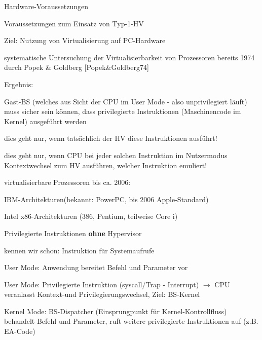 \documentclass[a4paper]{article}
\newcommand{\cmark}{\ding{51}}
\newcommand{\xmark}{\ding{55}}
\begin{document}
\begin{multicols}{3}
    Hardware-Voraussetzungen

    \begin{itemize*}
        \item
        Voraussetzungen zum Einsatz von Typ-1-HV
        \begin{itemize*}
            \item Ziel: Nutzung von Virtualisierung auf PC-Hardware
            \item systematische Untersuchung der Virtualisierbarkeit von Prozessoren bereits 1974 durch Popek \& Goldberg {[}Popek\&Goldberg74{]}
            \item Ergebnis: \begin{itemize*} \item   Gast-BS (welches aus Sicht der CPU im User Mode - also   unprivilegiert läuft) muss sicher sein können, dass privilegierte   Instruktionen (Maschinencode im Kernel) ausgeführt werden \item   dies geht nur, wenn tatsächlich der HV diese Instruktionen   ausführt! \item   dies geht nur, wenn CPU bei jeder solchen Instruktion im   Nutzermodus Kontextwechsel zum HV ausführen, welcher Instruktion   emuliert! \end{itemize*}
        \end{itemize*}
        \item
        virtualisierbare Prozessoren bis ca. 2006:
        \begin{itemize*}
            \item \cmark  IBM-Architekturen(bekannt: PowerPC, bis 2006 Apple-Standard)
            \item \xmark  Intel x86-Architekturen (386, Pentium, teilweise Core i)
        \end{itemize*}
    \end{itemize*}

    Privilegierte Instruktionen \textbf{ohne} Hypervisor

    \begin{itemize*}
        \item
        kennen wir schon: Instruktion für Systemaufrufe
    \end{itemize*}

    \begin{enumerate*}
        \item
        User Mode: Anwendung bereitet Befehl und Parameter vor
        \item
        User Mode: Privilegierte Instruktion (syscall/Trap - Interrupt)
        $\rightarrow$  CPU veranlasst Kontext-und
        Privilegierungswechsel, Ziel: BS-Kernel
        \item
        Kernel Mode: BS-Dispatcher (Einsprungpunkt für Kernel-Kontrollfluss)
        behandelt Befehl und Parameter, ruft weitere privilegierte
        Instruktionen auf (z.B. EA-Code)
    \end{enumerate*}


\end{multicols}
\end{document}
